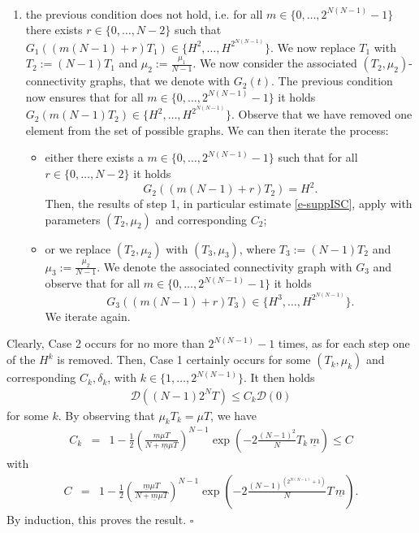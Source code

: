 \documentclass[journal]{article}
\newenvironment{proof}{{\it Proof.}~~}{\hfill$\square$}
\newcommand{\diam}[1]{\mathcal{D}(#1)}
\begin{document}
\begin{proof}
\begin{enumerate}
\begin{itemize}
\item on the time interval $$[(m+1)(N-1)T_1,(N-1)2^NT]$$ one again uses the fact that the support is contractive, thus 
\begin{eqnarray}
&&\diam{(N-1)2^NT}\leq \diam{(m+1)(N-1)T_1}\leq C_1 \diam{0}.\label{e-suppISC}
\end{eqnarray}
Remark that the final time does not depend on $T_1$.
\end{itemize}
\item the previous condition does not hold, i.e. for all $m\in \{0,\ldots, 2^{N(N-1)}-1\}$ there exists $r\in\{0,\ldots,N-2\}$ such that $G_1((m(N-1)+r)T_1)\in \{H^2,\ldots,H^{2^{N(N-1)}}\}$. We now replace $T_1$ with $T_2:=(N-1)T_1$ and $\mu_2:=\frac{\mu_1}{N-1}$. We now consider the associated $(T_2,\mu_2)$-connectivity graphs, that we denote with $G_2(t)$. The previous condition now ensures that for all $m\in \{0,\ldots, 2^{N(N-1)}-1\}$ it holds $G_2(m(N-1)T_2)\in \{H^2,\ldots,H^{2^{N(N-1)}}\}$. Observe that we have removed one element from the set of possible graphs. We can then iterate the process:
\begin{itemize}
\item either there exists a $m\in \{0,\ldots, 2^{N(N-1)}-1\}$ such that for all $r\in\{0,\ldots,N-2\}$ it holds 
$$G_2((m(N-1)+r)T_2)=H^2.$$ Then, the results of step 1, in particular estimate \eqref{e-suppISC}, apply with parameters $(T_2,\mu_2)$ and corresponding $C_2$;
\item or we replace $(T_2,\mu_2)$ with $(T_3,\mu_3)$, where $T_3:=(N-1)T_2$ and $\mu_3:=\frac{\mu_2}{N-1}$. We denote the associated connectivity graph with $G_3$ and observe that for all $m\in \{0,\ldots, 2^{N(N-1)}-1\}$ it holds 
$$G_3((m(N-1)+r)T_3)\in \{H^3,\ldots,H^{2^{N(N-1)}}\}.$$ We iterate again.
\end{itemize}
\end{enumerate}
Clearly, Case 2 occurs for no more than $2^{N(N-1)}-1$ times, as for each step one of the $H^k$ is removed. Then, Case 1 certainly occurs for some $(T_k,\mu_k)$ and corresponding $C_k,\delta_k$, with $k\in\{1,\ldots,2^{N(N-1)}\}$. It then holds
\begin{eqnarray*}
\diam{(N-1)2^NT}\leq  C_k\diam{0}
\end{eqnarray*}
for some $k$.  By observing that $\mu_kT_k=\mu T$, we have\\
\begin{eqnarray*}
C_k&=&1-\tfrac12\left( \tfrac{\underline{m}\mu T}{N+\underline{m}\mu T}    \right)^{N-1}\exp(-2\tfrac{(N-1)^2}{N}T_k\,\underline{m})\leq C
\end{eqnarray*}
with
\begin{eqnarray*}
C&=&1-\tfrac12\left( \tfrac{\underline{m}\mu T}{N+\underline{m}\mu T}    \right)^{N-1}\exp(-2\tfrac{(N-1)^{(2^{N(N-1)}+1)}}{N}T\,\underline{m}).
\end{eqnarray*}
By induction, this proves the result. \end{proof}
\end{document}
